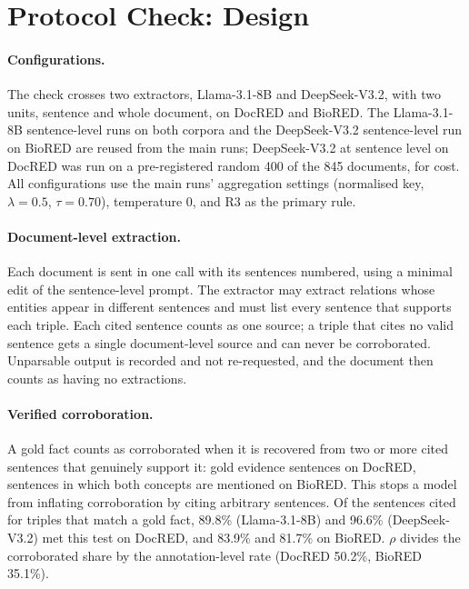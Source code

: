 \documentclass[11pt]{article}
\begin{document}
\section{Protocol Check: Design}
\label{sec:s11}

\paragraph{Configurations.} The check crosses two extractors,
Llama-3.1-8B and DeepSeek-V3.2, with two units, sentence and whole
document, on DocRED and BioRED. The Llama-3.1-8B sentence-level runs on
both corpora and the DeepSeek-V3.2 sentence-level run on BioRED are
reused from the main runs; DeepSeek-V3.2 at sentence level on DocRED was
run on a pre-registered random 400 of the 845 documents, for cost. All
configurations use the main runs' aggregation settings (normalised key,
$\lambda=0.5$, $\tau=0.70$), temperature 0, and R3 as the primary rule.

\paragraph{Document-level extraction.} Each document is sent in one
call with its sentences numbered, using a minimal edit of the
sentence-level prompt. The extractor may extract relations whose
entities appear in different sentences and must list every sentence
that supports each triple. Each cited sentence counts as one source; a
triple that cites no valid sentence gets a single document-level source
and can never be corroborated. Unparsable output is recorded and not
re-requested, and the document then counts as having no extractions.

\paragraph{Verified corroboration.} A gold fact counts as corroborated
when it is recovered from two or more cited sentences that genuinely
support it: gold evidence sentences on DocRED, sentences in which both
concepts are mentioned on BioRED. This stops a model from inflating
corroboration by citing arbitrary sentences. Of the sentences cited for
triples that match a gold fact, 89.8\% (Llama-3.1-8B) and 96.6\%
(DeepSeek-V3.2) met this test on DocRED, and 83.9\% and 81.7\% on BioRED.
$\rho$ divides the corroborated share by the annotation-level rate
(DocRED 50.2\%, BioRED 35.1\%).
\end{document}
